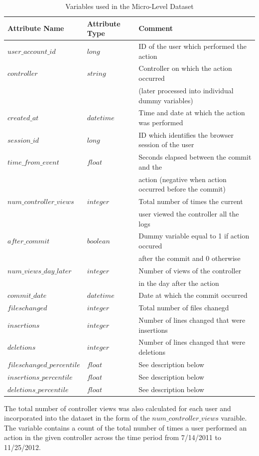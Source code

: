\documentclass[12pt]{article}
\begin{document}
\begin{table}
\footnotesize
\centering
\caption{Variables used in the Micro-Level Dataset}
\begin{tabular}{l | l | l}
Attribute Name & Attribute Type & Comment \\
\hline \hline
$user\_account\_id$ & $long$ & ID of the user which performed the action \\
$controller$ & $string$ & Controller on which the action occurred \\
 & & (later processed into individual dummy variables) \\
$created\_at$ & $datetime$ & Time and date at which the action was performed \\
$session\_id$ & $long$ & ID which identifies the browser session of the user \\
$time\_from\_event$ & $float$ & Seconds elapsed between the commit and the \\
 & & action (negative when action occurred before the commit) \\
$num\_controller\_views$ & $integer$ & Total number of times the current \\ 
 & & user viewed the controller all the logs \\
$after\_commit$ & $boolean$ & Dummy variable equal to 1 if action occured \\ 
 & & after the commit and 0 otherwise \\
$num\_views\_day\_later$ & $integer$ & Number of views of the controller \\
 & & in the day after the action \\
$commit\_date$ & $datetime$ & Date at which the commit occurred \\
$fileschanged$ & $integer$ & Total number of files chanegd \\
$insertions$ & $integer$ & Number of lines changed that were insertions \\
$deletions$ & $integer$ & Number of lines changed that were deletions \\
$fileschanged\_percentile$ & $float$ & See description below \\
$insertions\_percentile$ & $float$ & See description below \\
$deletions\_percentile$ & $float$ & See description below \\
\end{tabular}
\end{table}

The total number of controller views was also calculated for each user and incorporated into the dataset in the form of the $num\_controller\_views$ varaible. The variable contains a count of the total number of times a user performed an action in the given controller across the time period from 7/14/2011 to 11/25/2012. 
\end{document}
